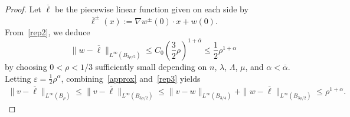 \documentclass[letter,11pt]{amsart}
\newcommand{\vep}{\varepsilon}
\theoremstyle{definition}
\numberwithin{equation}{section}
\begin{document}
\begin{proof}
\medskip

Let $\overline{\ell}$ be the piecewise linear function given on each side by
\[
\overline{\ell}^{\pm}(x) := \nabla w^{\pm}(0) \cdot x + w(0).
\]
From~\eqref{rep2}, we deduce 
\begin{equation}
\label{rep3}
\|w - \overline{\ell}\|_{L^{\infty}(B_{3\rho/2})} 
\leq C_0 \left(\frac{3}{2} \rho\right)^{1+\overline{\alpha}}
\leq \frac{1}{2} \rho^{1+\alpha}
\end{equation}
by choosing $0 < \rho< 1/3$  sufficiently small depending on $n$, $\lambda$, $\Lambda$, $\mu$, and $\alpha < \overline{\alpha}$.
Letting $\vep = \frac{1}{2} \rho^{\alpha}$, combining~\eqref{approx} and~\eqref{rep3} yields
\begin{equation}
\label{rep4}
\begin{split}
\|v - \overline{\ell}\|_{L^{\infty}(B_{\rho})} 
\leq \|v - \overline{\ell}\|_{L^{\infty}(B_{3\rho/2})} 
\leq \|v-w\|_{L^{\infty}(B_{3/4})} + \|w - \overline{\ell}\|_{L^{\infty}(B_{3\rho/2})} 
\leq \rho^{1+\alpha}.
\end{split}
\end{equation}

\medskip


\end{proof}
\end{document}
